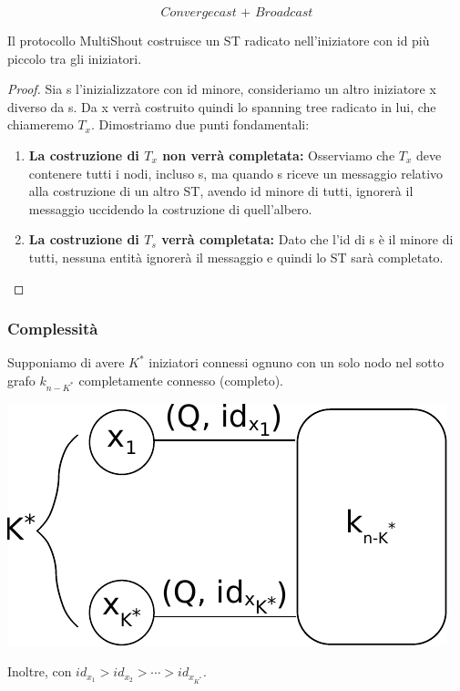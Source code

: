 $$
    \textit{Convergecast + Broadcast}
$$

\begin{theorem}
    Il protocollo MultiShout costruisce un ST radicato nell'iniziatore con
    id più piccolo tra gli iniziatori.
\end{theorem}

\begin{proof}
    Sia s l'inizializzatore con id minore, consideriamo un altro iniziatore x
    diverso da s. Da x verrà costruito quindi lo spanning tree radicato in lui,
    che chiameremo $T_x$. Dimostriamo due punti fondamentali:
    \begin{enumerate}
        \item \textbf{La costruzione di $T_x$ non verrà completata:} Osserviamo che
              $T_x$ deve contenere tutti i nodi, incluso s, ma quando s riceve un
              messaggio relativo alla costruzione di un altro ST, avendo id minore di
              tutti, ignorerà il messaggio uccidendo la costruzione di quell'albero.
        \item \textbf{La costruzione di $T_s$ verrà completata:} Dato che l'id di s
              è il minore di tutti, nessuna entità ignorerà il messaggio e quindi lo ST
              sarà completato.
    \end{enumerate}
\end{proof}

\subsubsection{Complessità}
Supponiamo di avere $K^*$ iniziatori connessi ognuno con un solo nodo nel sotto
grafo $k_{n-K^*}$ completamente connesso (completo).
\begin{center}
    \includegraphics[scale=0.9]{capitoli/costruzione-spanning-tree/imgs/n_39}
\end{center}
Inoltre, con $id_{x_1} > id_{x_2} > \cdots > id_{x_{K^*}}$.

